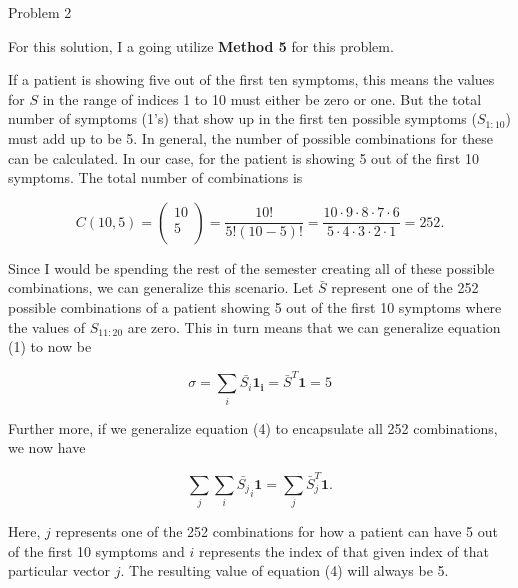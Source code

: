 \begin{problem}{Problem 2}
    \begin{highlight}
        For this solution, I a going utilize \textbf{Method 5} for this problem. \vspace*{1em}

        If a patient is showing five out of the first ten symptoms, this means the values for $S$ in the range of indices 1 to 10 must either be zero or one. But the total number
        of symptoms (1's) that show up in the first ten possible symptoms ($S_{1:10}$) must add up to be 5. In general, the number of possible combinations for these can be calculated.
        In our case, for the patient is showing 5 out of the first 10 symptoms. The total number of combinations is

        \begin{equation}
            C(10,5) = 
            \begin{pmatrix}
                10 \\
                5 \\
            \end{pmatrix}
            = \frac{10!}{5!(10-5)!} = \frac{10\cdot9\cdot8\cdot7\cdot6}{5\cdot4\cdot3\cdot2\cdot1} = 252.
        \end{equation}

        Since I would be spending the rest of the semester creating all of these possible combinations, we can generalize this scenario. Let $\bar{S}$ represent one of the 252 possible
        combinations of a patient showing 5 out of the first 10 symptoms where the values of $S_{11:20}$ are zero. This in turn means that we can generalize equation (1) to now be

        \begin{equation}
            \sigma = \sum_{i} \bar{S_{i}}\mathbf{1_{i}} = \bar{S}^{T}\mathbf{1} = 5
        \end{equation}

        Further more, if we generalize equation (4) to encapsulate all 252 combinations, we now have

        \begin{equation}
            \sum_{j}\sum_{i} \bar{S_{j}}_{i}\mathbf{1} = \sum_{j} \bar{S}^{T}_{j}\mathbf{1}.
        \end{equation}

        Here, $j$ represents one of the 252 combinations for how a patient can have 5 out of the first 10 symptoms and $i$ represents the index of that given index of that particular vector
        $j$. The resulting value of equation (4) will always be 5.
    \end{highlight}


\end{problem}
